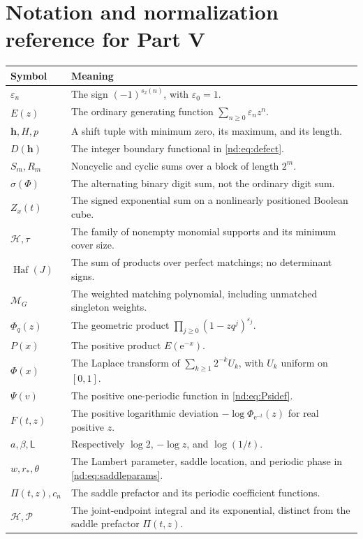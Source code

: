 \documentclass[11pt,a4paper,oneside,openany]{book}
\numberwithin{equation}{chapter}
\theoremstyle{definition}
\theoremstyle{remark}
\newcommand{\eps}{\varepsilon}
\newcommand{\e}{\mathrm e}
\DeclareMathOperator{\Haf}{Haf}
\newcommand{\HH}{\mathcal H}
\newcommand{\MM}{\mathcal M}
\newcommand{\Lsad}{\mathsf L}
\begin{document}
\chapter{Notation and normalization reference for Part V}
\begin{longtable}{@{}p{}p{}@{}}
\toprule
Symbol&Meaning\\
\midrule
\endhead
\(\eps_n\)&The sign \((-1)^{s_2(n)}\), with \(\eps_0=1\).\\[2mm]
\(E(z)\)&The ordinary generating function \(\sum_{n\ge0}\eps_nz^n\).\\[2mm]
\(\bm h,H,p\)&A shift tuple with minimum zero, its maximum, and its length.\\[2mm]
\(D(\bm h)\)&The integer boundary functional in \eqref{nd:eq:defect}.\\[2mm]
\(S_m,R_m\)&Noncyclic and cyclic sums over a block of length \(2^m\).\\[2mm]
\(\sigma(\Phi)\)&The alternating binary digit sum, not the ordinary digit sum.\\[2mm]
\(Z_x(t)\)&The signed exponential sum on a nonlinearly positioned Boolean cube.\\[2mm]
\(\HH,\tau\)&The family of nonempty monomial supports and its minimum cover size.\\[2mm]
\(\Haf(J)\)&The sum of products over perfect matchings; no determinant signs.\\[2mm]
\(\MM_G\)&The weighted matching polynomial, including unmatched singleton weights.\\[2mm]
\(\Phi_q(z)\)&The geometric product \(\prod_{j\ge0}(1-zq^j)^{\eps_j}\).\\[2mm]
\(P(x)\)&The positive product \(E(\e^{-x})\).\\[2mm]
\(\Phi(x)\)&The Laplace transform of \(\sum_{k\ge1}2^{-k}U_k\), with \(U_k\) uniform on \([0,1]\).\\[2mm]
\(\Psi(v)\)&The positive one-periodic function in \eqref{nd:eq:Psidef}.\\[2mm]
\(F(t,z)\)&The positive logarithmic deviation \(-\log\Phi_{\e^{-t}}(z)\) for real positive \(z\).\\[2mm]
\(a,\beta,\Lsad\)&Respectively \(\log2\), \(-\log z\), and \(\log(1/t)\).\\[2mm]
\(w,r_*,\theta\)&The Lambert parameter, saddle location, and periodic phase in \eqref{nd:eq:saddleparams}.\\[2mm]
\(\Pi(t,z),c_n\)&The saddle prefactor and its periodic coefficient functions.\\[2mm]
\(\mathcal H,\mathcal P\)&The joint-endpoint integral and its exponential, distinct from the saddle prefactor \(\Pi(t,z)\).\\
\bottomrule
\end{longtable}
\end{document}

